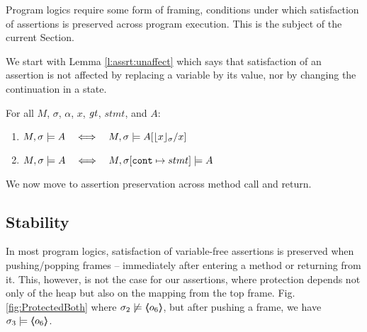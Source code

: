 Program logics require some form of framing, \ie conditions under which  satisfaction of  assertions is preserved across program execution. 
This is the subject of the current Section.

We start with  Lemma \ref{l:assrt:unaffect}  which says that satisfaction of an assertion is not affected by replacing a variable by its value, nor by changing the continuation in a state.


\begin{lemma}
\label{lemma:addr:expr}
\label{l:assrt:unaffect}
For all $M$, $\sigma$, $\alpha$, $x$, $\mathit{gt}$, $stmt$, and $A$:

\begin{enumerate}
\item
\label{one:ad:exp}
\label{l:assrt:unaffect:one}
$\satisfiesA{M}{\sigma}{A}   \ \ \ \Longleftrightarrow\ \ \ \satisfiesA{M}{\sigma}{A[{\interpret \sigma x}/x]}   $ 
\item
$ \satisfiesA{M}{\sigma}{A}   \ \ \ \Longleftrightarrow\ \ \ \satisfiesA{M}{\sigma[\prg{cont}\mapsto stmt]}{A}$ 
\end{enumerate}

\end{lemma}

 \noindent
We now move to assertion preservation across method call and return. %

\subsection{Stability} %
\label{s:preserve:call:ret}
In most program logics, satisfaction of  variable-free assertions  is preserved when pushing/popping frames
-- \ie immediately after entering a method or  returning from it.
This, however, is not   the case for our assertions, where protection depends not only of the heap but also 
on the mapping from the top frame. %
\Eg  Fig. \ref{fig:ProtectedBoth} where 
$\sigma_2 \not\models \langle\!\!\langle o_6 \rangle\!\!\rangle$, but after pushing a frame, we have $\sigma_3  \models \langle\!\!\langle o_6 \rangle\!\!\rangle$.
 

